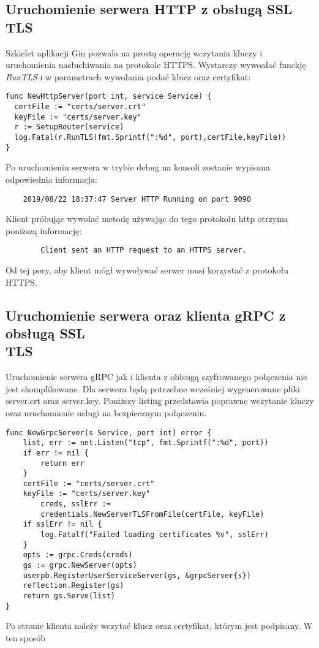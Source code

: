 \subsection{Uruchomienie serwera HTTP z obsługą SSL\\TLS}
Szkielet aplikacji Gin pozwala na prostą operację wczytania kluczy i uruchomienia nasłuchiwania na protokole HTTPS. Wystarczy wywoałać funckję \textit{RunTLS} i w parametrach wywołania podać klucz oraz certyfikat:
\begin{lstlisting}[caption=Dodanie obsługi połączenia szyfrowanego do serwera HTTP]  
func NewHttpServer(port int, service Service) {
  certFile := "certs/server.crt"
  keyFile := "certs/server.key"
  r := SetupRouter(service)
  log.Fatal(r.RunTLS(fmt.Sprintf(":%d", port),certFile,keyFile))
}
\end{lstlisting}
Po uruchomieniu serwera w trybie debug na konsoli zostanie wypisana odpowiednia informacja:
\begin{lstlisting}
    2019/08/22 18:37:47 Server HTTP Running on port 9090
\end{lstlisting}
Klient próbując wywołać metodę używając do tego protokołu http otrzyma poniższą informację:
\begin{center}
    \begin{lstlisting}
        Client sent an HTTP request to an HTTPS server.
    \end{lstlisting}    
\end{center}
Od tej pory, aby klient mógł wywoływać serwer musi korzystać z protokołu HTTPS.
\subsection{Uruchomienie serwera oraz klienta gRPC z obsługą SSL\\TLS}
Uruchomienie serwera gRPC jak i klienta z obłsugą szyfrowanego połączenia nie jest skomplikowane. Dla serwera będą potrzebne wcześniej wygenerowane pliki server.crt oraz server.key. Poniższy listing przedstawia poprawne wczytanie kluczy oraz uruchomienie usługi na bezpiecznym połączeniu.
\begin{lstlisting}[caption=Dodanie obsługi połączenia szyfrowanego do serwera gGRPC]
    func NewGrpcServer(s Service, port int) error {
	list, err := net.Listen("tcp", fmt.Sprintf(":%d", port))
	if err != nil {
		return err
	}
	certFile := "certs/server.crt"
	keyFile := "certs/server.key"
        creds, sslErr := 
        credentials.NewServerTLSFromFile(certFile, keyFile)
	if sslErr != nil {
		log.Fatalf("Failed loading certificates %v", sslErr)
	}
	opts := grpc.Creds(creds)
	gs := grpc.NewServer(opts)
	userpb.RegisterUserServiceServer(gs, &grpcServer{s})
	reflection.Register(gs)
	return gs.Serve(list)
}
\end{lstlisting} 
Po stronie klienta należy wczytać klucz oraz certyfikat, którym jest podpisany. W ten sposób 
